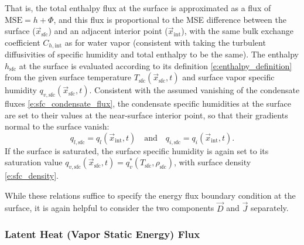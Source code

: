 \documentclass{report}
\begin{document}
\begin{enumerate}
    That is, the total enthalpy flux at the surface is approximated as a flux of $\mathrm{MSE} =h + \Phi$, and this flux is proportional to the MSE difference between the surface ($\vec{x}_\mathrm{sfc}$) and an adjacent interior point ($\vec{x}_\mathrm{int}$), with the same bulk exchange coefficient $C_{h, \mathrm{int}}$ as for water vapor (consistent with taking the turbulent diffusivities of specific humidity and total enthalpy to be the same). The enthalpy $h_\mathrm{sfc}$ at the surface is evaluated according to its definition \eqref{e:enthalpy_definition} from the given surface temperature $T_\mathrm{sfc}(\vec{x}_\mathrm{sfc}, t)$ and surface vapor specific humidity $q_{v, \mathrm{sfc}}(\vec{x}_\mathrm{sfc}, t)$. Consistent with the assumed vanishing of the condensate fluxes \eqref{e:sfc_condensate_flux}, the condensate specific humidities at the surface are set to their values at the near-surface interior point, so that their gradients normal to the surface vanish:
    \[
    q_{l, \mathrm{sfc}} = q_l(\vec{x}_\mathrm{int}, t) \quad \text{and} \quad q_{i, \mathrm{sfc}} = q_i(\vec{x}_\mathrm{int}, t).
    \]
    If the surface is saturated, the surface specific humidity is again set to its saturation value $q_{v, \mathrm{sfc}}(\vec{x}_\mathrm{sfc}, t) =q_v^*(T_\mathrm{sfc}, \rho_\mathrm{sfc})$, with surface density \eqref{e:sfc_density}.
\end{enumerate}
While these relations suffice to specify the energy flux boundary condition at the surface, it is again helpful to consider the two components $\vec{D}$ and $\vec{J}$ separately. 

\subsubsection{Latent Heat (Vapor Static Energy) Flux}
\end{document}
